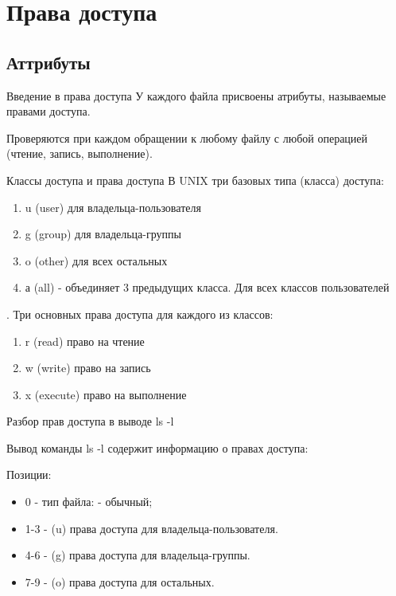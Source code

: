 \section{Права доступа}

\subsection{Аттрибуты}

\begin{frame}{Введение в права доступа}
  У каждого файла присвоены атрибуты, называемые \alert{правами доступа}.\newline
  
  Проверяются при каждом обращении к любому файлу с любой операцией (чтение, запись, выполнение).\newline \pause

\end{frame}


\begin{frame}{Классы доступа и права доступа}
  В UNIX три базовых типа (класса) доступа:
  \begin{enumerate}
    \item \alert{u} (user) для владельца-пользователя
    \item \alert{g} (group) для владельца-группы         
    \item \alert{o} (other) для всех остальных \pause
    \item \alert{а} (all) - объединяет 3 предыдущих класса. Для всех классов пользователей
  \end{enumerate} \pause 
  .\newline 
  Три основных права доступа для каждого из классов:
  \begin{enumerate}
    \item \alert{r} (read) право на чтение           
    \item \alert{w} (write) право на запись           
    \item \alert{x} (execute) право на выполнение  
  \end{enumerate}

\end{frame}

\begin{frame}[fragile]{Разбор прав доступа в выводе ls -l}

  Вывод команды \alert{ls -l} содержит информацию о правах доступа:

  

  Позиции:
  \begin{itemize}
    \item 0 - тип  файла: - обычный;
    \item 1-3 - (\alert{u}) права доступа для владельца-пользователя.
    \item 4-6 - (\alert{g}) права доступа для владельца-группы.
    \item 7-9 - (\alert{o}) права доступа для остальных.
  \end{itemize}
\end{frame}

